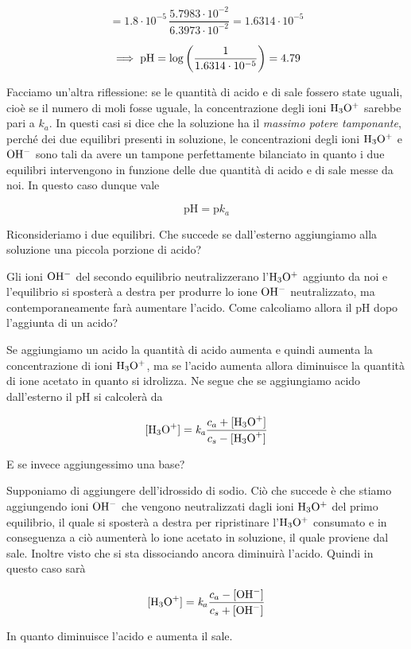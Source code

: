 $$=1.8 \cdot 10^{-5}\,\frac{5.7983\cdot 10^{-2}}{6.3973\cdot 10^{-2}}=1.6314\cdot 10^{-5}$$

$$\implies \rm pH=\log\left( \frac{1}{1.6314\cdot 10^{-5}} \right)=4.79$$

Facciamo un'altra riflessione: se le quantità di acido e di sale fossero state uguali, cioè se il numero di moli fosse uguale, la concentrazione degli ioni $\rm H_3O^+$ sarebbe pari a $k_a$. In questi casi si dice che la soluzione ha il \textit{massimo potere tamponante}, perché dei due equilibri presenti in soluzione, le concentrazioni degli ioni $\rm H_3O^+$ e $\rm OH^-$ sono tali da avere un tampone perfettamente bilanciato in quanto i due equilibri intervengono in funzione delle due quantità di acido e di sale messe da noi. In questo caso dunque vale

$$\text{pH}=\text{p}k_a$$

Riconsideriamo i due equilibri. Che succede se dall'esterno aggiungiamo alla soluzione una piccola porzione di acido?

Gli ioni $\rm OH^-$ del secondo equilibrio neutralizzerano l'$\rm H_3O^+$ aggiunto da noi e l'equilibrio si sposterà a destra per produrre lo ione $\rm OH^-$ neutralizzato, ma contemporaneamente farà aumentare l'acido. Come calcoliamo allora il pH dopo l'aggiunta di un acido?

Se aggiungiamo un acido la quantità di acido aumenta e quindi aumenta la concentrazione di ioni $\rm H_3O^+$, ma se l'acido aumenta allora diminuisce la quantità di ione acetato in quanto si idrolizza. Ne segue che se aggiungiamo acido dall'esterno il pH si calcolerà da

$${[\text{H}_3\text{O}^+]}=\textit{k}_\textit{a} \frac{c_a + \rm{[\text{H}_3\text{O}^+]}}{c_s - \rm{[\text{H}_3\text{O}^+]}}$$

E se invece aggiungessimo una base?

Supponiamo di aggiungere dell'idrossido di sodio. Ciò che succede è che stiamo aggiungendo ioni $\rm OH^-$ che vengono neutralizzati dagli ioni $\rm H_3O^+$ del primo equilibrio, il quale si sposterà a destra per ripristinare l'$\rm H_3O^+$ consumato e in conseguenza a ciò aumenterà lo ione acetato in soluzione, il quale proviene dal sale. Inoltre visto che si sta dissociando ancora diminuirà l'acido. Quindi in questo caso sarà

$${[\text{H}_3\text{O}^+]}=\textit{k}_a \frac{c_a - {[\text{OH}^-]}}{c_s + \rm{[\text{OH}^-]}}$$

In quanto diminuisce l'acido e aumenta il sale.

